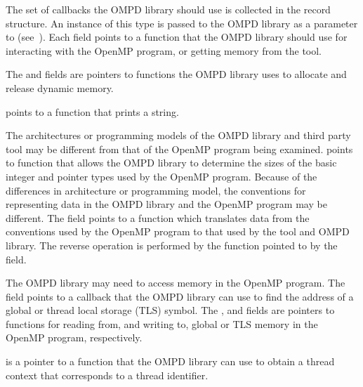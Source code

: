 \descr
The set of callbacks the OMPD library should use is collected
in the  record structure.
An instance of this type is passed to the OMPD library
as a parameter to  (see~).
Each field points to a function that the OMPD library should use
for interacting with the OpenMP program, or getting memory from
the tool.

The  and  fields are
pointers to functions the OMPD library uses to allocate and release
dynamic memory.

 points to a function that prints a string.

The architectures or programming models of the OMPD library and
third party tool may be different from that of the OpenMP
program being examined.
 points to function that allows
the OMPD library to determine the sizes of the basic integer
and pointer types used by the OpenMP program.
Because of the differences in architecture or programming model,
the conventions for representing data in the OMPD library and
the OpenMP program may be different.
The  field points to a function which translates
data from the conventions used by the OpenMP program to that used
by the tool and OMPD library.
The reverse operation is performed by the function pointed
to by the  field.

The OMPD library may need to access memory in the OpenMP program.
The  field points to a callback that the
OMPD library can use to find the address of a global or thread
local storage (TLS) symbol.
The ,  and  fields are
pointers to functions for reading from, and writing to, global or TLS
memory in the OpenMP program, respectively.

 is a pointer to a function
that the OMPD library can use to obtain a thread context that corresponds to
a thread identifier.


